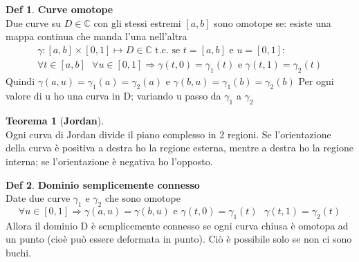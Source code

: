 \documentclass[a4paper,11pt]{report}
\theoremstyle{remark}
\theoremstyle{definition}
\newtheorem*{teo}{Teorema}
\newtheorem*{Def}{Def}
\begin{document}
	\begin{Def}{\textbf{Curve omotope}}\hfil\\
		Due curve su $D \in \mathbb{C}$ con gli stessi estremi $[a,b]$ sono omotope se: esiste una mappa continua che manda l'una nell'altra
		\begin{gather*}
			\gamma:[a,b]\times[0,1] \mapsto D \in \mathbb{C} \mbox{ t.c. se } t=[a,b] \mbox{ e } u=[0,1]: \\
			\forall t \in [a,b] \mbox{ } \forall u \in [0,1] \Rightarrow \gamma(t,0) = 	\gamma_1(t) \mbox{ e } \gamma(t,1)= \gamma_2(t)
		\end{gather*}
		Quindi $\gamma(a,u)=\gamma_1(a)=\gamma_2(a) \mbox{ e } \gamma(b,u)=\gamma_1(b)=\gamma_2(b)$ \newline
		Per ogni valore di u ho una curva in D; variando u passo da $\gamma_1$ a $\gamma_2$ 
	\end{Def} 
		\begin{teo}[\textbf{Jordan}]\hfil\\
			Ogni curva di Jordan divide il piano complesso in 2 regioni. \newline
			Se l'orientazione della curva è positiva a destra ho la regione esterna, mentre a destra ho la regione interna; se l'orientazione è negativa ho l'opposto. 
		\end{teo}
		\begin{Def}{\textbf{Dominio semplicemente connesso}}\hfil\\
			Date due curve $\gamma_1$ e $\gamma_2$ che sono omotope 
			\begin{equation*}
					\forall u \in [0,1] \Rightarrow \gamma(a,u)=\gamma(b,u) \mbox{ e } \gamma(t,0)=\gamma_1(t) 	\mbox{ } \gamma(t,1)=\gamma_2(t)
			\end{equation*}
			Allora il dominio D è semplicemente connesso se ogni curva chiusa è omotopa ad un punto (cioè può essere deformata in punto). \newline
			Ciò è possibile solo se non ci sono buchi.
		\end{Def}
\end{document}
